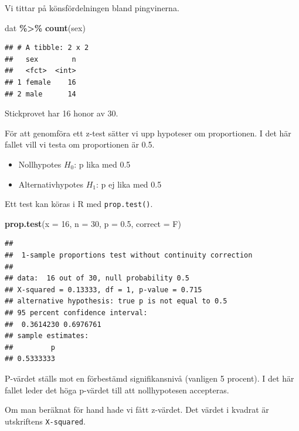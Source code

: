 \documentclass[
]{book}
\newenvironment{Shaded}{\begin{snugshade}}{\end{snugshade}}
\newcommand{\AttributeTok}[1]{\textcolor[rgb]{0.13,0.29,0.53}{#1}}
\newcommand{\DecValTok}[1]{\textcolor[rgb]{0.00,0.00,0.81}{#1}}
\newcommand{\FloatTok}[1]{\textcolor[rgb]{0.00,0.00,0.81}{#1}}
\newcommand{\FunctionTok}[1]{\textcolor[rgb]{0.13,0.29,0.53}{\textbf{#1}}}
\newcommand{\NormalTok}[1]{#1}
\newcommand{\SpecialCharTok}[1]{\textcolor[rgb]{0.81,0.36,0.00}{\textbf{#1}}}
\providecommand{\tightlist}{%
  \setlength{\itemsep}{0pt}\setlength{\parskip}{0pt}}
\theoremstyle{definition}
\theoremstyle{definition}
\theoremstyle{definition}
\theoremstyle{definition}
\theoremstyle{remark}
\begin{document}
Vi tittar på könsfördelningen bland pingvinerna.

\begin{Shaded}
\begin{Highlighting}[]
\NormalTok{dat }\SpecialCharTok{\%\textgreater{}\%} \FunctionTok{count}\NormalTok{(sex)}
\end{Highlighting}
\end{Shaded}

\begin{verbatim}
## # A tibble: 2 x 2
##   sex        n
##   <fct>  <int>
## 1 female    16
## 2 male      14
\end{verbatim}

Stickprovet har 16 honor av 30.

För att genomföra ett z-test sätter vi upp hypoteser om proportionen. I det här fallet vill vi testa om proportionen är 0.5.

\begin{itemize}
\tightlist
\item
  Nollhypotes \(H_0\): p lika med 0.5
\item
  Alternativhypotes \(H_1\): p ej lika med 0.5
\end{itemize}

Ett test kan köras i R med \texttt{prop.test()}.

\begin{Shaded}
\begin{Highlighting}[]
\FunctionTok{prop.test}\NormalTok{(}\AttributeTok{x =} \DecValTok{16}\NormalTok{, }\AttributeTok{n =} \DecValTok{30}\NormalTok{, }\AttributeTok{p =} \FloatTok{0.5}\NormalTok{, }\AttributeTok{correct =}\NormalTok{ F)}
\end{Highlighting}
\end{Shaded}

\begin{verbatim}
## 
##  1-sample proportions test without continuity correction
## 
## data:  16 out of 30, null probability 0.5
## X-squared = 0.13333, df = 1, p-value = 0.715
## alternative hypothesis: true p is not equal to 0.5
## 95 percent confidence interval:
##  0.3614230 0.6976761
## sample estimates:
##         p 
## 0.5333333
\end{verbatim}

P-värdet ställs mot en förbestämd signifikansnivå (vanligen 5 procent). I det här fallet leder det höga p-värdet till att nollhypotesen accepteras.

Om man beräknat för hand hade vi fått z-värdet. Det värdet i kvadrat är utskriftens \texttt{X-squared}.
\end{document}
